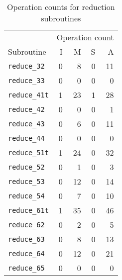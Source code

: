 \begin{comment}
Divisors of types 0, 11, 21, 22, 31 already reduced,
therefore no reduction subroutines are needed for these types.
Divisors of types 33, 44, 65 are principal divisors;
they may be reduced at no cost by returning the zero divisor.
Reduction subroutines for types 41, 51, and 61
are implemented only for typical divisors.
Atypical divisors of types 41, 51, and 61 are reduced by flipping twice.
\end{comment}
\begin{table}[h]
  \caption{Operation counts for reduction subroutines}
  \label{tab_reduction_costs}
\begin{center}
\begin{tabular}{|l|rrrr|}
  \hline
  & \multicolumn{4}{c|}{Operation count} \\
  Subroutine & I & M & S & A \\
  \hline  
  {\tt reduce\_32}  & 0 & 8 & 0 & 11 \\
  {\tt reduce\_33}  & 0 & 0 & 0 & 0 \\
  {\tt reduce\_41t} & 1 & 23 & 1 & 28 \\
  {\tt reduce\_42}  & 0 & 0 & 0 & 1 \\
  {\tt reduce\_43}  & 0 & 6 & 0 & 11 \\
  {\tt reduce\_44}  & 0 & 0 & 0 & 0 \\
  {\tt reduce\_51t} & 1 & 24 & 0 & 32 \\
  {\tt reduce\_52}  & 0 & 1 & 0 & 3 \\
  {\tt reduce\_53}  & 0 & 12 & 0 & 14 \\
  {\tt reduce\_54}  & 0 & 7 & 0 & 10 \\
  {\tt reduce\_61t} & 1 & 35 & 0 & 46 \\
  {\tt reduce\_62}  & 0 & 2 & 0 & 5 \\
  {\tt reduce\_63}  & 0 & 8 & 0 & 13 \\
  {\tt reduce\_64}  & 0 & 12 & 0 & 21 \\
  {\tt reduce\_65}  & 0 & 0 & 0 & 0 \\
  \hline
\end{tabular}
\end{center}
\end{table}

